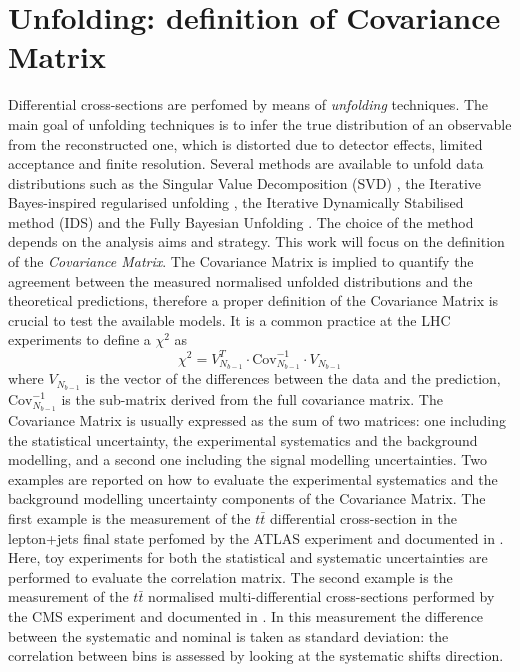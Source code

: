 \documentclass[12pt]{article}
\begin{document}
\section{Unfolding: definition of Covariance Matrix}
Differential cross-sections are perfomed by means of \emph{unfolding} techniques. The main goal of unfolding techniques is to infer the true distribution of an observable from the reconstructed one, which is distorted due to detector effects, limited acceptance and finite resolution. 
Several methods are available to unfold data distributions such as the Singular Value Decomposition (SVD) \cite{H_cker_1996}, the Iterative Bayes-inspired regularised unfolding \cite{DAGOSTINI1995487}, the Iterative Dynamically Stabilised method (IDS) \cite{malaescu2009iterative} and the Fully Bayesian Unfolding \cite{choudalakis2012fully}. The choice of the method depends on the analysis aims and strategy. 
This work will focus on the definition of the \emph{Covariance Matrix}. The Covariance Matrix is implied to quantify the agreement between the measured normalised unfolded distributions and the theoretical predictions, therefore a proper definition of the Covariance Matrix is crucial to test the available models. It is a common practice at the LHC experiments to define a $\chi^2$ as
\begin{equation}
\chi^2 = V^T_{N_{b-1}}\cdot\mathrm{Cov}^{-1}_{N_{b-1}}\cdot V_{N_{b-1}}
\end{equation}
where $V_{N_{b-1}}$ is the vector of the differences between the data and the prediction, $\mathrm{Cov}^{-1}_{N_{b-1}}$ is the sub-matrix derived from the full covariance matrix.
The Covariance Matrix is usually expressed as the sum of two matrices: one including the statistical uncertainty, the experimental systematics and the background modelling, and a second one including the signal modelling uncertainties. 
Two examples are reported on how to evaluate the experimental systematics and the background modelling uncertainty components of the Covariance Matrix.
The first example is the measurement of the $t\bar{t}$ differential cross-section in the lepton+jets final state perfomed by the ATLAS experiment and documented in \cite{atlas_diffrential}. Here, toy experiments for both the statistical and systematic uncertainties are performed to evaluate the correlation matrix.
The second example is the measurement of the $t\bar{t}$ normalised multi-differential cross-sections performed by the CMS experiment and documented in \cite{Sirunyan_2020}. In this measurement the difference between the systematic and nominal is taken as standard deviation: the correlation between bins is assessed by looking at the systematic shifts direction.
\end{document}
